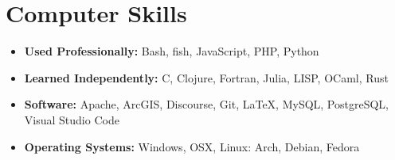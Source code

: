 \documentclass[letterpaper,10pt]{article}
\begin{document}
\section{Computer Skills}
\begin{itemize}
    \item \textbf{Used Professionally:} Bash, fish, JavaScript, PHP, Python
    \item \textbf{Learned Independently:} C, Clojure, Fortran, Julia, LISP, OCaml, Rust
    \item \textbf{Software:} Apache, ArcGIS, Discourse, Git, \LaTeX, MySQL, PostgreSQL, Visual Studio Code
    \item \textbf{Operating Systems:} Windows, OSX, Linux: Arch, Debian, Fedora
\end{itemize}
\end{document}
